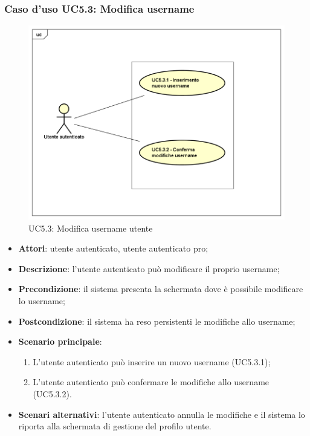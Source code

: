 \subsubsection{Caso d'uso UC5.3: Modifica username}
\label{UC5.3}
\begin{figure}[h]
	\centering
	\includegraphics[scale=0.5,keepaspectratio]{UML/UC5_3.png}
	\caption{UC5.3: Modifica username utente}
\end{figure}
\begin{itemize}
	\item \textbf{Attori}: utente autenticato, utente autenticato pro;
	\item \textbf{Descrizione}: l'utente autenticato può modificare il proprio username;
	\item \textbf{Precondizione}: il sistema presenta la schermata dove è possibile modificare lo username;
	\item \textbf{Postcondizione}: il sistema ha reso persistenti le modifiche allo username;
	\item \textbf{Scenario principale}:
	\begin{enumerate}
		\item L'utente autenticato può inserire un nuovo username (UC5.3.1);
		\item L'utente autenticato può confermare le modifiche allo username (UC5.3.2).
	\end{enumerate}
	\item \textbf{Scenari alternativi}: l'utente autenticato annulla le modifiche e il sistema lo riporta alla schermata di gestione del profilo utente.
\end{itemize}

